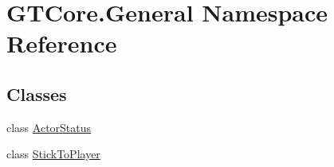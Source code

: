 \hypertarget{namespace_g_t_core_1_1_general}{}\section{G\+T\+Core.\+General Namespace Reference}
\label{namespace_g_t_core_1_1_general}
\subsection*{Classes}
\begin{DoxyCompactItemize}
\item 
class \hyperlink{class_g_t_core_1_1_general_1_1_actor_status}{Actor\+Status}
\item 
class \hyperlink{class_g_t_core_1_1_general_1_1_stick_to_player}{Stick\+To\+Player}
\end{DoxyCompactItemize}
